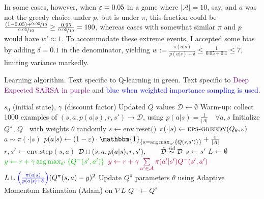 \documentclass{article}
\begin{document}
In some cases, however, when \(\varepsilon=0.05\) in a game where \(|\mathcal{A}| = 10\), say, and \(a\) was not the greedy choice under \(p\), but is under \(\pi\), this fraction could be \(\frac{(1-0.05) + \nicefrac{0.05}{10}}{\nicefrac{0.05}{10}} \ge \frac{0.95}{\nicefrac{0.05}{10}} = 190\), whereas cases with somewhat similar \(\pi\) and \(p\) would have \(w' \approx 1\). To accommodate these extreme events, I accepted some bias by adding \(\delta = 0.1\) in the denominator, yielding \(w := \frac{\pi(a|s)}{p(a|s) + \delta} \le \frac{1}{0.05 + 0.1} \le 7\), limiting variance markedly.

\begin{algorithm}
    \caption{Learning algorithm. Text specific to \textcolor{dgreen}{Q-learning in green}. Text specific to \textcolor{purple}{Deep Expected SARSA in purple} and \textcolor{blue}{blue when weighted importance sampling is used}.}
    \begin{algorithmic}[1]
        \Require $s_0$ (initial state), $\gamma$ (discount factor)
        \Ensure Updated $Q$ values
        \State \(\mathcal{D} \gets \emptyset\)
        \State Warm-up: collect 1000 examples of $(s, a, p(a|s), r, s') \rightarrow \mathcal{D}$, using $p(a|s) = \frac{1}{|A|} \quad \forall a, s$
        \State Initialize $Q^\pi$, $Q^-$ with weights \(\theta\) randomly
        \Repeat
            \State $s \gets \text{env.reset()}$
            \Repeat
                \State $\pi(\cdot | s) \gets \Call{eps-greedy}{Q_\theta, \eps}$
                \State $a \sim \pi(\cdot|s)$
                \State $p(a|s) \gets (1 - \eps) \cdot \mathbbm{1}_{\set{a = \arg\max_{a'}\set{Q(s,a')}}} + \frac{\eps}{|A|}$
                \State $r, s' \gets \text{env.step}(s, a)$
                \State $\mathcal{D} \cup (s, a, p(a|s), r, s'),\qquad \tilde{\mathcal{D}} \overset{\textit{iid}}{\sim}\mathcal{D}$
                \State $s \gets s'$
                \State $L \gets \emptyset$
                    \State $\textcolor{dgreen}{y \gets r + \gamma \arg\max_{a'}\set{Q^-(s',a')}}$
                    \State $\textcolor{purple}{y \gets r + \gamma \sum\limits_{a' \in \mathcal{A}} \pi(a' | s') Q^-(s', a')}$
                    \State $L \cup \textcolor{blue}{\left( \frac{\pi(a|s)}{p(a|s) + \delta} \right)} (Q^\pi(s, a) - y)^2$ %
                    \EndFor
                \State Update $Q^\pi$ parameters \(\theta\) using Adaptive Momentum Estimation (Adam) on \(\nabla L\)
                    \State $Q^- \gets Q^\pi$
                \EndIf
        
            
    \end{algorithmic}
\end{algorithm}
\end{document}

